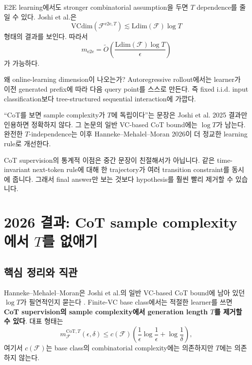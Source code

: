 \documentclass[11pt,a4paper,oneside,openany]{memoir}
\newcommand{\F}{\mathcal{F}}
\newcommand{\VC}{\mathrm{VCdim}}
\newcommand{\Ldim}{\mathrm{Ldim}}
\theoremstyle{definition}
\begin{document}
E2E learning에서도 stronger combinatorial assumption을 두면 $T$ dependence를 줄일 수 있다.
Joshi et al.은
\[
\VC\!\left(\F^{\mathrm{e2e},T}\right)
\lesssim
\Ldim(\F)\log T
\]
형태의 결과를 보인다.
따라서
\[
m_{\mathrm{e2e}}
=
\widetilde O\!\left(
\frac{\Ldim(\F)\log T}{\epsilon}
\right)
\]
가 가능하다.

왜 online-learning dimension이 나오는가? Autoregressive rollout에서는 learner가 이전 generated prefix에 따라 다음 query point를 스스로 만든다.
즉 fixed i.i.d. input classification보다 tree-structured sequential interaction에 가깝다.

\begin{warningbox}
``CoT를 보면 sample complexity가 $T$에 독립이다''는 문장은 Joshi et al. 2025 결과만 인용하면 정확하지 않다.
그 논문의 일반 VC-based CoT bound에는 $\log T$가 남는다.
완전한 $T$-independence는 이후 Hanneke--Mehalel--Moran 2026이 더 정교한 learning rule로 개선한다.
\end{warningbox}

\begin{presentbox}
CoT supervision의 통계적 이점은 중간 문장이 친절해서가 아닙니다. 같은 time-invariant next-token rule에 대해 한 trajectory가 여러 transition constraint를 동시에 줍니다. 그래서 final answer만 보는 것보다 hypothesis를 훨씬 빨리 제거할 수 있습니다.
\end{presentbox}

\chapter{2026 결과: CoT sample complexity에서 \texorpdfstring{$T$}{T}를 없애기}

\section{핵심 정리와 직관}

Hanneke--Mehalel--Moran은 Joshi et al.의 일반 VC-based CoT bound에 남아 있던 $\log T$가 필연적인지 묻는다 \cite{hanneke2026}. Finite-VC base class에서는 적절한 learner를 쓰면 \textbf{CoT supervision의 sample complexity에서 generation length $T$를 제거할 수 있다}. 대표 형태는
\[
m^{\mathrm{CoT},T}_{\F}(\epsilon,\delta)
\le c(\F)
\left(
\frac1\epsilon\log\frac1\epsilon
+\log\frac1\delta
\right),
\]
여기서 $c(\F)$는 base class의 combinatorial complexity에는 의존하지만 $T$에는 의존하지 않는다.
\end{document}
